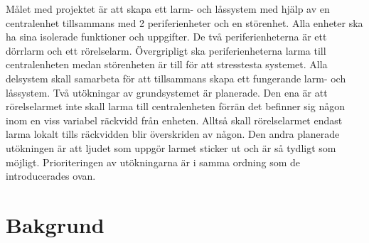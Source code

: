 \documentclass[a4paper]{article}
\begin{document}
Målet med projektet är att skapa ett larm- och låssystem med hjälp av en centralenhet tillsammans med 2 periferienheter och en störenhet. Alla enheter ska ha sina isolerade funktioner och uppgifter. De två periferienheterna är ett dörrlarm och ett rörelselarm. Övergripligt ska periferienheterna larma till centralenheten medan störenheten är till för att stresstesta systemet. Alla delsystem skall samarbeta för att tillsammans skapa ett fungerande larm- och låssystem.
\newline\newline
Två utökningar av grundsystemet är planerade. Den ena är att rörelselarmet inte skall larma till centralenheten förrän det befinner sig någon inom en viss variabel räckvidd från enheten. Alltså skall rörelselarmet endast larma lokalt tills räckvidden blir överskriden av någon. Den andra planerade utökningen är att ljudet som uppgör larmet sticker ut och är så tydligt som möjligt. Prioriteringen av utökningarna är i samma ordning som de introducerades ovan.


\section{Bakgrund}
\label{sec:bakgrund}


\end{document}
